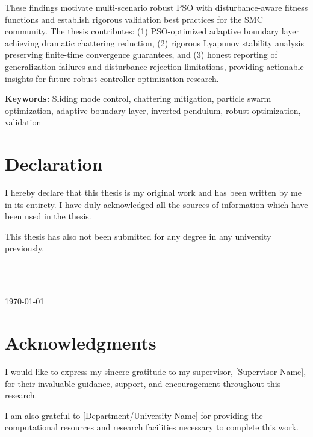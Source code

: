 \documentclass[12pt,a4paper,oneside]{report}
\begin{document}
These findings motivate multi-scenario robust PSO with disturbance-aware fitness functions and establish rigorous validation best practices for the SMC community. The thesis contributes: (1) PSO-optimized adaptive boundary layer achieving dramatic chattering reduction, (2) rigorous Lyapunov stability analysis preserving finite-time convergence guarantees, and (3) honest reporting of generalization failures and disturbance rejection limitations, providing actionable insights for future robust controller optimization research.

\textbf{Keywords:} Sliding mode control, chattering mitigation, particle swarm optimization, adaptive boundary layer, inverted pendulum, robust optimization, validation

\chapter*{Declaration}

I hereby declare that this thesis is my original work and has been written by me in its entirety. I have duly acknowledged all the sources of information which have been used in the thesis.

This thesis has also not been submitted for any degree in any university previously.

\vspace{2cm}

\noindent
\rule{5cm}{0.4pt}\\
[Your Name]\\
\today

\chapter*{Acknowledgments}

I would like to express my sincere gratitude to my supervisor, [Supervisor Name], for their invaluable guidance, support, and encouragement throughout this research.

I am also grateful to [Department/University Name] for providing the computational resources and research facilities necessary to complete this work.
\end{document}
